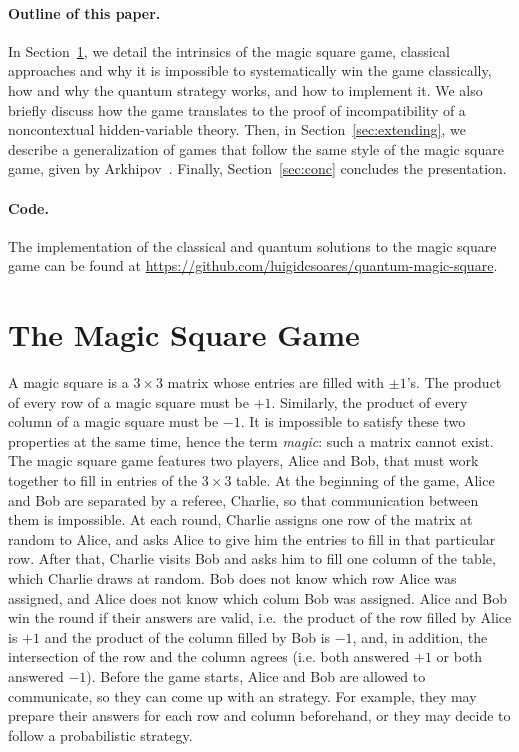\documentclass{llncs}
\begin{document}
\paragraph{Outline of this paper.}
In Section~\ref{sec:magic-square}, we detail the intrinsics of the
magic square game, classical approaches and why it is impossible to
systematically win the game classically, how and why the quantum
strategy works, and how to implement it. We also briefly discuss how
the game translates to the proof of incompatibility of a
noncontextual hidden-variable theory. Then, in
Section~\ref{sec:extending}, we describe a generalization of games
that follow the same style of the magic square game, given
by Arkhipov~\cite{arkhipov:2012}. Finally, Section~\ref{sec:conc} concludes the
presentation.

\paragraph{Code.} The implementation of the classical and quantum
solutions to the magic square game can be found at
\url{https://github.com/luigidcsoares/quantum-magic-square}.

\section{The Magic Square Game}
\label{sec:magic-square}

A magic square is a \(3 \times 3\) matrix whose entries are filled
with \(\pm 1\)'s. The product of every row of a magic square must be
\(+1\). Similarly, the product of every column of a magic square must
be \(-1\). It is impossible to satisfy these two properties at the same
time, hence the term \emph{magic}: such a matrix cannot exist. The
magic square game features two players, Alice and Bob, that must work
together to fill in entries of the \(3 \times 3\) table.  At the
beginning of the game, Alice and Bob are separated by a referee,
Charlie, so that communication between them is impossible. At each
round, Charlie assigns one row of the matrix at random to Alice, and
asks Alice to give him the entries to fill in that particular
row. After that, Charlie visits Bob and asks him to fill one column of
the table, which Charlie draws at random.  Bob does not know which row
Alice was assigned, and Alice does not know which colum Bob was
assigned. Alice and Bob win the round if their answers are valid,
i.e.\ the product of the row filled by Alice is \(+1\) and the product
of the column filled by Bob is \(-1\), and, in addition, the
intersection of the row and the column agrees (i.e. both answered
\(+1\) or both answered \(-1\)). Before the game starts, Alice and Bob
are allowed to communicate, so they can come up with an strategy.  For
example, they may prepare their answers for each row and column
beforehand, or they may decide to follow a probabilistic strategy.
\end{document}
